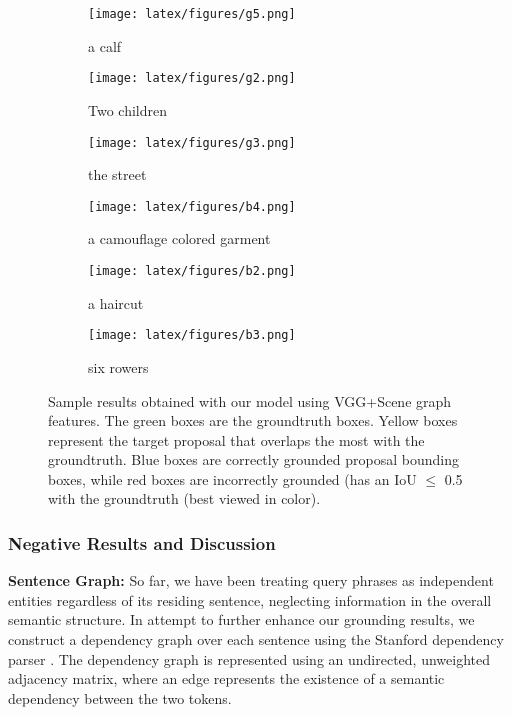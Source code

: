 \begin{figure*}[t]
  \begin{subfigure}[t]{.32\linewidth}
    \centering\texttt{[image: latex/figures/g5.png]}
    \caption{a calf}
  \end{subfigure}\hfill
    \begin{subfigure}[t]{.32\linewidth}
    \centering\texttt{[image: latex/figures/g2.png]}
    \caption{Two children}
  \end{subfigure}\hfill
    \begin{subfigure}[t]{.32\linewidth}
    \centering\texttt{[image: latex/figures/g3.png]}
    \caption{the street}
  \end{subfigure}
  \par\medskip
  
  \begin{subfigure}[t]{.32\linewidth}
    \centering\texttt{[image: latex/figures/b4.png]}
    \caption{a camouflage colored garment}
  \end{subfigure}\hfill
    \begin{subfigure}[t]{.32\linewidth}
    \centering\texttt{[image: latex/figures/b2.png]}
    \caption{a haircut}
  \end{subfigure}\hfill
    \begin{subfigure}[t]{.32\linewidth}
    \centering\texttt{[image: latex/figures/b3.png]}
    \caption{six rowers}
  \end{subfigure}

  \caption{Sample results obtained with our model using VGG+Scene graph features. The green boxes are the groundtruth boxes. Yellow boxes represent the target proposal that overlaps the most with the groundtruth. Blue boxes are correctly grounded proposal bounding boxes, while red boxes are incorrectly grounded (has an IoU $\leq$ 0.5 with the groundtruth (best viewed in color).}
  \label{fig: qualitative}
\end{figure*}

\subsubsection{Negative Results and Discussion}
\textbf{Sentence Graph: }
So far, we have been treating query phrases as independent entities regardless of its residing sentence, neglecting information in the overall semantic structure. In attempt to further enhance our grounding results, we construct a dependency graph over each sentence using the Stanford dependency parser \cite{de2008stanford}. The dependency graph is represented using an undirected, unweighted adjacency matrix, where an edge represents the existence of a semantic dependency between the two tokens. 

